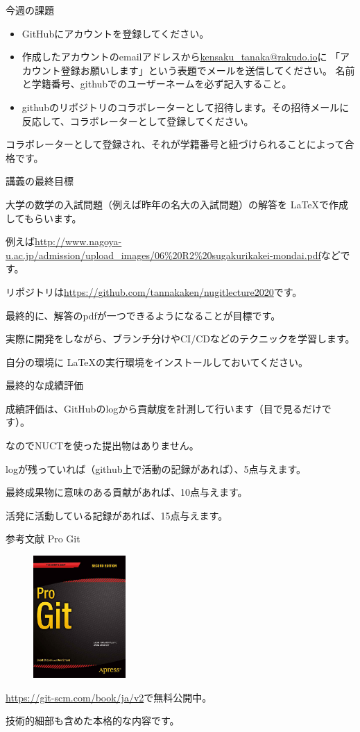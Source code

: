 \documentclass[12pt, unicode]{beamer}
\begin{document}
\begin{frame}{今週の課題}
\begin{itemize}
\item GitHubにアカウントを登録してください。
\item 作成したアカウントのemailアドレスから\url{kensaku\_tanaka@rakudo.io}に
「アカウント登録お願いします」という表題でメールを送信してください。
名前と学籍番号、githubでのユーザーネームを必ず記入すること。
\item githubのリポジトリのコラボレーターとして招待します。その招待メールに反応して、コラボレーターとして登録してください。
\end{itemize}
コラボレーターとして登録され、それが学籍番号と紐づけられることによって合格です。
\end{frame}

\begin{frame}{講義の最終目標}

大学の数学の入試問題（例えば昨年の名大の入試問題）の解答を \LaTeX で作成してもらいます。

例えば\url{http://www.nagoya-u.ac.jp/admission/upload_images/06\%20R2\%20sugakurikakei-mondai.pdf}などです。

リポジトリは\url{https://github.com/tannakaken/nugitlecture2020}です。

最終的に、解答のpdfが一つできるようになることが目標です。

実際に開発をしながら、ブランチ分けやCI/CDなどのテクニックを学習します。

自分の環境に \LaTeX の実行環境をインストールしておいてください。

\end{frame}
\begin{frame}{最終的な成績評価}

成績評価は、GitHubのlogから貢献度を計測して行います（目で見るだけです）。

なのでNUCTを使った提出物はありません。

logが残っていれば（github上で活動の記録があれば）、5点与えます。

最終成果物に意味のある貢献があれば、10点与えます。

活発に活動している記録があれば、15点与えます。

\end{frame}
\begin{frame}{参考文献}
{\huge Pro Git}

\begin{figure}
\includegraphics[width=100pt]{progit2.png}
\end{figure}

\url{https://git-scm.com/book/ja/v2}で無料公開中。

技術的細部も含めた本格的な内容です。

\end{frame}
\end{document}
